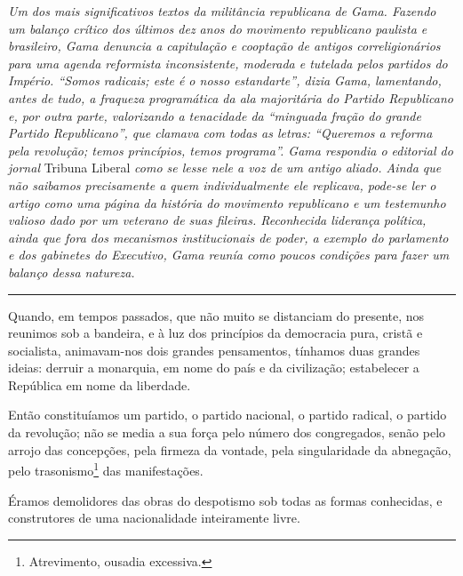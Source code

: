 \emph{Um dos mais significativos textos da militância republicana de
Gama. Fazendo um balanço crítico dos últimos dez anos do movimento
republicano paulista e brasileiro, Gama denuncia a capitulação e
cooptação de antigos correligionários para uma agenda reformista
inconsistente, moderada e tutelada pelos partidos do Império. ``Somos
radicais; este é o nosso estandarte'', dizia Gama, lamentando, antes de
tudo, a fraqueza programática da ala majoritária do Partido Republicano
e, por outra parte, valorizando a tenacidade da ``minguada fração do
grande Partido Republicano'', que clamava com todas as letras:
``Queremos a reforma pela revolução; temos princípios, temos programa''.
Gama respondia o editorial do jornal} Tribuna Liberal \emph{como se
lesse nele a voz de um antigo aliado. Ainda que não saibamos
precisamente a quem individualmente ele replicava, pode-se ler o artigo
como uma página da história do movimento republicano e um testemunho
valioso dado por um veterano de suas fileiras. Reconhecida liderança
política, ainda que fora dos mecanismos institucionais de poder, a
exemplo do parlamento e dos gabinetes do Executivo, Gama reunía como
poucos condições para fazer um balanço dessa natureza. }

\begin{center}\rule{0.5\linewidth}{\linethickness}\end{center}

Quando, em tempos passados, que não muito se distanciam do presente, nos
reunimos sob a bandeira, e à luz dos princípios da democracia pura,
cristã e socialista, animavam-nos dois grandes pensamentos, tínhamos
duas grandes ideias: derruir a monarquia, em nome do país e da
civilização; estabelecer a República em nome da liberdade.

Então constituíamos um partido, o partido nacional, o partido radical, o
partido da revolução; não se media a sua força pelo número dos
congregados, senão pelo arrojo das concepções, pela firmeza da vontade,
pela singularidade da abnegação, pelo trasonismo\footnote{Atrevimento,
  ousadia excessiva.} das manifestações.

Éramos demolidores das obras do despotismo sob todas as formas
conhecidas, e construtores de uma nacionalidade inteiramente livre.

